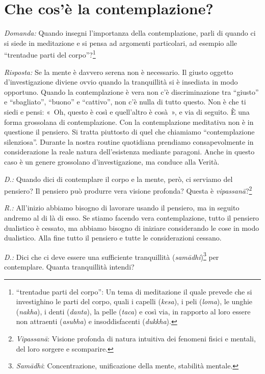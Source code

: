 \chapter{Che cos'è la contemplazione?}

\emph{Domanda:} Quando insegni l'importanza della contemplazione, parli di
quando ci si siede in meditazione e si pensa ad argomenti particolari,
ad esempio alle ``trentadue parti del
corpo''?\footnote{``trentadue parti del corpo'': Un
  tema di meditazione il quale prevede che si investighino le parti del
  corpo, quali i capelli (\emph{kesa}), i peli (\emph{loma}), le unghie
  (\emph{nakha}), i denti (\emph{danta}), la pelle (\emph{taca}) e così
  via, in rapporto al loro essere non attraenti (\emph{asubha}) e
  insoddisfacenti (\emph{dukkha}).}

\emph{Risposta:} Se la mente è davvero serena non è necessario. Il giusto
oggetto d'investigazione diviene ovvio quando la tranquillità si è
insediata in modo opportuno. Quando la contemplazione è vera non c'è
discriminazione tra ``giusto'' e ``sbagliato'', ``buono'' e ``cattivo'',
non c'è nulla di tutto questo. Non è che ti siedi e pensi: «~Oh, questo
è così e quell'altro è cosà~», e via di seguito. È una forma grossolana
di contemplazione. Con la contemplazione meditativa non è in questione
il pensiero. Si tratta piuttosto di quel che chiamiamo ``contemplazione
silenziosa''. Durante la nostra routine quotidiana prendiamo
consapevolmente in considerazione la reale natura dell'esistenza
mediante paragoni. Anche in questo caso è un genere grossolano
d'investigazione, ma conduce alla Verità.

\emph{D.:} Quando dici di contemplare il corpo e la mente, però, ci serviamo
del pensiero? Il pensiero può produrre vera visione profonda? Questa è
\emph{vipassanā}?\footnote{\emph{Vipassanā}: Visione
  profonda di natura intuitiva dei fenomeni fisici e mentali, del loro
  sorgere e scomparire.}

\emph{R.:} All'inizio abbiamo bisogno di lavorare usando il pensiero, ma in
seguito andremo al di là di esso. Se stiamo facendo vera contemplazione,
tutto il pensiero dualistico è cessato, ma abbiamo bisogno di iniziare
considerando le cose in modo dualistico. Alla fine tutto il pensiero e
tutte le considerazioni cessano.

\emph{D.:} Dici che ci deve essere una sufficiente tranquillità
(\emph{samādhi})\footnote{\emph{Samādhi}:
  Concentrazione, unificazione della mente, stabilità mentale.} per
contemplare. Quanta tranquillità intendi?

